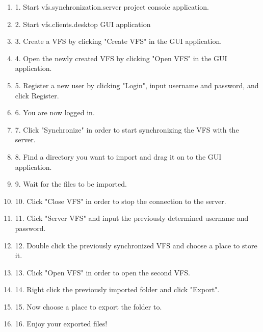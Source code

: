 \documentclass[a4paper,12pt]{article}
\begin{document}


\begin{enumerate}
    \item 1. Start vfs.synchronization.server project console application.
    \item 2. Start vfs.clients.desktop GUI application
    \item 3. Create a VFS by clicking "Create VFS" in the GUI application.
    \item 4. Open the newly created VFS by clicking "Open VFS" in the GUI application.
    \item 5. Register a new user by clicking "Login", input username and password, and click Register.
    \item 6. You are now logged in.
    \item 7. Click "Synchronize" in order to start synchronizing the VFS with the server.
    \item 8. Find a directory you want to import and drag it on to the GUI application.
    \item 9. Wait for the files to be imported.
    \item 10. Click "Close VFS" in order to stop the connection to the server.
    \item 11. Click "Server VFS" and input the previously determined username and password.
    \item 12. Double click the previously synchronized VFS and choose a place to store it.
    \item 13. Click "Open VFS" in order to open the second VFS.
    \item 14. Right click the previously imported folder and click "Export".
    \item 15. Now choose a place to export the folder to.
    \item 16. Enjoy your exported files!
\end{enumerate}
\end{document}
